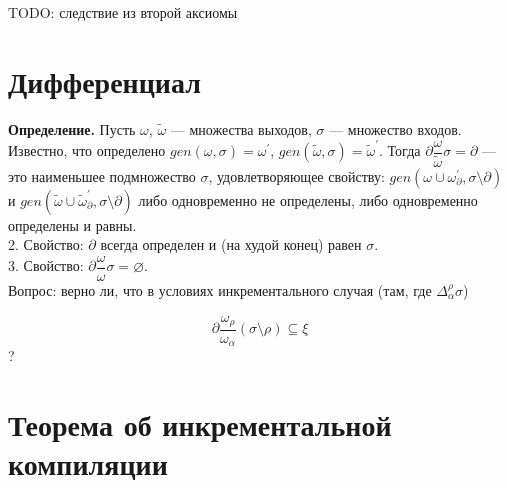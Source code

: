 %
%



\hrulefill

TODO: следствие из второй аксиомы\\

\section{Дифференциал}

\textbf{Определение.} Пусть $\omega$, $\tilde{\omega}$ --- множества выходов, $\sigma$ --- множество входов. Известно, что определено $gen(\omega, \sigma) = \omega^\prime$, $gen(\tilde{\omega}, \sigma) = \tilde{\omega}^\prime$. Тогда $\partial\dfrac{\omega}{\tilde{\omega}}\sigma = \partial$ --- это наименьшее подмножество $\sigma$, удовлетворяющее свойству: 
$gen(\omega \cup \omega^\prime_{\partial}, \sigma\setminus\partial)$ и
$gen(\tilde{\omega} \cup \tilde{\omega}^\prime_{\partial}, \sigma\setminus\partial)$ либо одновременно не определены, либо одновременно определены и равны. 
\\

2. Свойство: $\partial$ всегда определен и (на худой конец) равен $\sigma$.
\\

3. Свойство: $\partial\dfrac{\omega}{\omega}\sigma = \varnothing$.
\\

Вопрос: верно ли, что в условиях инкрементального случая (там, где $\Delta^\rho_\alpha\sigma$)

$$\partial\dfrac{\omega_\rho}{\omega_\alpha}(\sigma\setminus\rho)\subseteq\xi$$ ?

\begin{comment}
	\textbf{Доказательство:}

	\newcommand{\mypart}{\partial\dfrac{\omega_\rho}{\omega_\alpha}(\sigma\setminus\rho)}

	Докажем, что если $s \in \sigma\setminus\rho$, $s \notin \xi$, то $s \notin \mypart$. Обозначим $\tau = (\sigma\setminus\rho)\setminus\mypart$, тогда $\tau$ --- наибольшее подмножество $\sigma\setminus\rho$, такое, что $gen(\omega_\rho, \tau)$ определено $\Leftrightarrow$ $gen(\omega_\alpha, \tau)$ определено. Предположим, $s \in \mypart$, тогда $s \notin \tau$. Рассмотрим $gen(\omega_\rho, \tau)$.
\end{comment}

\newpage
\section{Теорема об инкрементальной компиляции}

